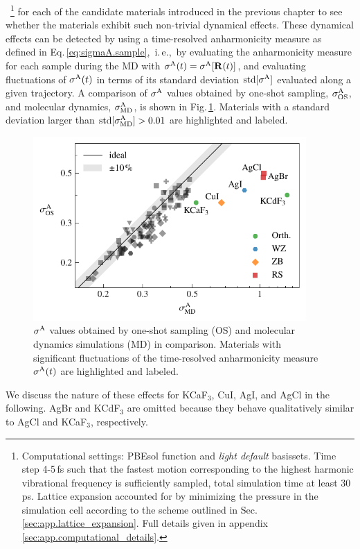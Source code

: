 ~\footnote{Computational settings: PBEsol function and \emph{light default} basissets. Time step 4-5\,fs such that the fastest motion corresponding to the highest harmonic vibrational frequency is sufficiently sampled, total simulation time at least 30\,ps. Lattice expansion accounted for by minimizing the pressure in the simulation cell according to the scheme outlined in Sec.\,\ref{sec:app.lattice_expansion}. Full details given in appendix \ref{sec:app.computational_details}.} for each of the candidate materials introduced in the previous chapter to see whether the materials exhibit such non-trivial dynamical effects. 
These dynamical effects can be detected by using a time-resolved anharmonicity measure as defined in Eq.\,\eqref{eq:sigmaA.sample},~i.\,e.,~by evaluating the anharmonicity measure for each sample during the MD with $\sigma^\mathrm{A}(t) = \sigma^\mathrm{A} [{\bf R} (t)]$, and evaluating fluctuations of $\sigma^\mathrm{A} (t)$ in terms of its standard deviation ${\rm std} [ \sigma^\mathrm{A} ]$ evaluated along a given trajectory. A comparison of $\sigma^\mathrm{A}$ values obtained by one-shot sampling, $\sigma^\mathrm{A}_\mathrm{OS}$, and molecular dynamics, $\sigma^\mathrm{A}_\mathrm{MD}$, is shown in Fig.\,\ref{fig:sigma_os_md_dataset}. Materials with a standard deviation larger than ${\rm std} [ \sigma^\mathrm{A}_\mathrm{MD} ] > 0.01$ are highlighted and labeled.
\begin{figure}
	\includegraphics[width=4.1in]{./data/plots/sigma_vs_sigma/sigma_os_md.pdf}
	\caption{$\sigma^\mathrm{A}$ values obtained by one-shot sampling (OS) and molecular dynamics simulations (MD) in comparison. Materials with significant fluctuations of the time-resolved anharmonicity measure $\sigma^\mathrm{A} (t)$ are highlighted and labeled.}
	\label{fig:sigma_os_md_dataset}
\end{figure}
We discuss the nature of these effects for KCaF$_3$, CuI, AgI, and AgCl in the following. AgBr and KCdF$_3$ are omitted because they behave qualitatively similar to AgCl and KCaF$_3$, respectively. 

